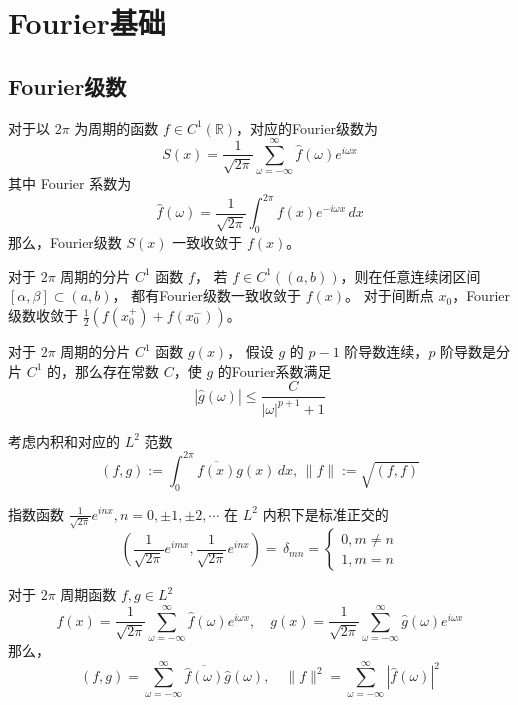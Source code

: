 \chapter{Fourier基础}

\section{Fourier级数}

\begin{theorem}
    对于以 $2\pi$ 为周期的函数 $f \in C^1(\mathbb{R})$，对应的Fourier级数为
    \[
        S(x) = \frac{1}{\sqrt{2\pi}} \sum_{\omega = -\infty}^\infty \hat{f}(\omega) e^{i \omega x}
    \]
    其中 Fourier 系数为
    \[
        \hat{f}(\omega) = \frac{1}{\sqrt{2\pi}} \int_{0}^{2\pi} f(x)e^{-i \omega x} \,dx
    \]
    那么，Fourier级数 $S(x)$ 一致收敛于 $f(x)$。
\end{theorem}


\begin{theorem}
    对于 $2\pi$ 周期的分片 $C^1$ 函数 $f$，
    若 $f \in C^1((a,b))$，则在任意连续闭区间 $[\alpha,\beta] \subset (a,b)$，
    都有Fourier级数一致收敛于 $f(x)$。
    对于间断点 $x_0$，Fourier 级数收敛于 $\frac12(f(x_0^+) + f(x_0^-))$。
\end{theorem}



\begin{theorem}
    对于 $2\pi$ 周期的分片 $C^1$ 函数 $g(x)$，
    假设 $g$ 的 $p-1$ 阶导数连续，$p$ 阶导数是分片 $C^1$ 的，那么存在常数 $C$，使 $g$ 的Fourier系数满足
    \[
        |\hat{g}(\omega)| \le \frac{C}{|\omega|^{p+1}+1}
    \]
\end{theorem}

考虑内积和对应的 $L^2$ 范数
\[
    (f,g) := \int_0^{2\pi} \overline{f(x)}g(x)\,dx,\,\|f\| := \sqrt{(f,f)}
\]


\begin{lemma}
    指数函数 $\frac{1}{\sqrt{2\pi}} e^{i n x},n=0,\pm 1,\pm 2,\cdots$
    在 $L^2$ 内积下是标准正交的
    \[
        \left(\frac{1}{\sqrt{2\pi}} e^{i m x},\frac{1}{\sqrt{2\pi}} e^{i n x}\right)
        =\, \delta_{mn} =  \left\{
        \begin{aligned}
            0, m \neq n \\
            1, m = n
        \end{aligned}
        \right.\]
\end{lemma}


\begin{theorem}[Parseval 关系]
    对于 $2\pi$ 周期函数 $f,g \in L^2$
    \[
        f(x) = \frac{1}{\sqrt{2\pi}} \sum_{\omega = -\infty}^\infty \hat{f}(\omega) e^{i \omega x},\quad
        g(x) = \frac{1}{\sqrt{2\pi}} \sum_{\omega = -\infty}^\infty \hat{g}(\omega) e^{i \omega x}
    \]
    那么，
    \[
        (f,g) = \sum_{\omega = -\infty}^\infty \overline{\hat{f}(\omega)} \hat{g}(\omega),\quad
        \|f\|^2 = \sum_{\omega = -\infty}^\infty |\hat{f}(\omega)|^2
    \]
\end{theorem}




